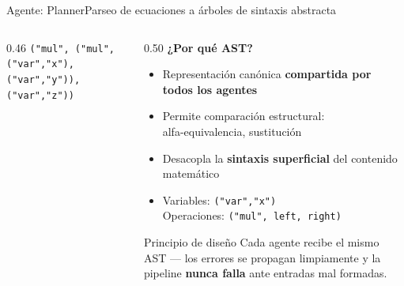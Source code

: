 \documentclass[aspectratio=169,10pt]{beamer}
\newcommand{\cy}[1]{\textcolor{AccentBlue}{\textbf{#1}}}
\begin{document}
\begin{frame}{Agente: Planner}{Parseo de ecuaciones a árboles de sintaxis abstracta}
\begin{columns}[T,onlytextwidth]
\begin{column}{0.46\textwidth}
      \vspace{4mm}
      \centering\texttt{\scriptsize ("mul", ("mul", ("var","x"), ("var","y")), ("var","z"))}
    \end{column}
    \hfill
    \begin{column}{0.50\textwidth}
      \vspace{4mm}
      \cy{¿Por qué AST?}
      \vspace{3mm}
      \begin{itemize}\setlength\itemsep{6pt}
        \item Representación canónica \textbf{compartida por todos los agentes}
        \item Permite comparación estructural:\\
              alfa-equivalencia, sustitución
        \item Desacopla la \textbf{sintaxis superficial} del contenido matemático
        \item Variables: \texttt{("var","x")}\\
              Operaciones: \texttt{("mul", left, right)}
      \end{itemize}
      \vspace{6mm}
      \begin{block}{Principio de diseño}
        Cada agente recibe el mismo AST ---
        los errores se propagan limpiamente y la pipeline
        \textbf{nunca falla} ante entradas mal formadas.
      \end{block}
    \end{column}
  \end{columns}
\end{frame}
\end{document}
